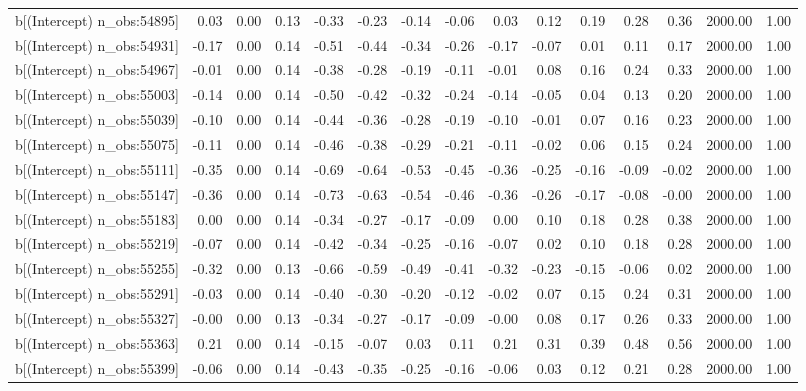 \begin{table}[ht]
\begin{tabular}{rrrrrrrrrrrrrrr}
  b[(Intercept) n\_obs:54895] & 0.03 & 0.00 & 0.13 & -0.33 & -0.23 & -0.14 & -0.06 & 0.03 & 0.12 & 0.19 & 0.28 & 0.36 & 2000.00 & 1.00 \\ 
  b[(Intercept) n\_obs:54931] & -0.17 & 0.00 & 0.14 & -0.51 & -0.44 & -0.34 & -0.26 & -0.17 & -0.07 & 0.01 & 0.11 & 0.17 & 2000.00 & 1.00 \\ 
  b[(Intercept) n\_obs:54967] & -0.01 & 0.00 & 0.14 & -0.38 & -0.28 & -0.19 & -0.11 & -0.01 & 0.08 & 0.16 & 0.24 & 0.33 & 2000.00 & 1.00 \\ 
  b[(Intercept) n\_obs:55003] & -0.14 & 0.00 & 0.14 & -0.50 & -0.42 & -0.32 & -0.24 & -0.14 & -0.05 & 0.04 & 0.13 & 0.20 & 2000.00 & 1.00 \\ 
  b[(Intercept) n\_obs:55039] & -0.10 & 0.00 & 0.14 & -0.44 & -0.36 & -0.28 & -0.19 & -0.10 & -0.01 & 0.07 & 0.16 & 0.23 & 2000.00 & 1.00 \\ 
  b[(Intercept) n\_obs:55075] & -0.11 & 0.00 & 0.14 & -0.46 & -0.38 & -0.29 & -0.21 & -0.11 & -0.02 & 0.06 & 0.15 & 0.24 & 2000.00 & 1.00 \\ 
  b[(Intercept) n\_obs:55111] & -0.35 & 0.00 & 0.14 & -0.69 & -0.64 & -0.53 & -0.45 & -0.36 & -0.25 & -0.16 & -0.09 & -0.02 & 2000.00 & 1.00 \\ 
  b[(Intercept) n\_obs:55147] & -0.36 & 0.00 & 0.14 & -0.73 & -0.63 & -0.54 & -0.46 & -0.36 & -0.26 & -0.17 & -0.08 & -0.00 & 2000.00 & 1.00 \\ 
  b[(Intercept) n\_obs:55183] & 0.00 & 0.00 & 0.14 & -0.34 & -0.27 & -0.17 & -0.09 & 0.00 & 0.10 & 0.18 & 0.28 & 0.38 & 2000.00 & 1.00 \\ 
  b[(Intercept) n\_obs:55219] & -0.07 & 0.00 & 0.14 & -0.42 & -0.34 & -0.25 & -0.16 & -0.07 & 0.02 & 0.10 & 0.18 & 0.28 & 2000.00 & 1.00 \\ 
  b[(Intercept) n\_obs:55255] & -0.32 & 0.00 & 0.13 & -0.66 & -0.59 & -0.49 & -0.41 & -0.32 & -0.23 & -0.15 & -0.06 & 0.02 & 2000.00 & 1.00 \\ 
  b[(Intercept) n\_obs:55291] & -0.03 & 0.00 & 0.14 & -0.40 & -0.30 & -0.20 & -0.12 & -0.02 & 0.07 & 0.15 & 0.24 & 0.31 & 2000.00 & 1.00 \\ 
  b[(Intercept) n\_obs:55327] & -0.00 & 0.00 & 0.13 & -0.34 & -0.27 & -0.17 & -0.09 & -0.00 & 0.08 & 0.17 & 0.26 & 0.33 & 2000.00 & 1.00 \\ 
  b[(Intercept) n\_obs:55363] & 0.21 & 0.00 & 0.14 & -0.15 & -0.07 & 0.03 & 0.11 & 0.21 & 0.31 & 0.39 & 0.48 & 0.56 & 2000.00 & 1.00 \\ 
  b[(Intercept) n\_obs:55399] & -0.06 & 0.00 & 0.14 & -0.43 & -0.35 & -0.25 & -0.16 & -0.06 & 0.03 & 0.12 & 0.21 & 0.28 & 2000.00 & 1.00 \\ 

\end{tabular}
\end{table}
